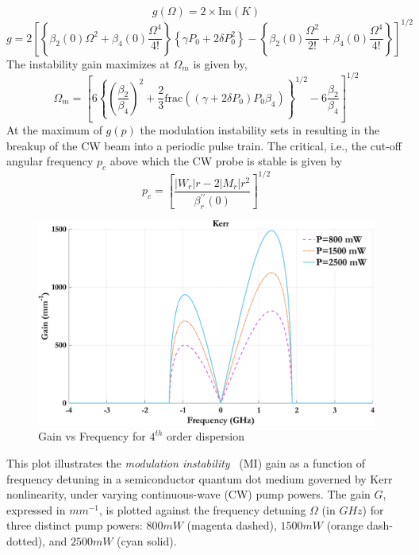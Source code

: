 \documentclass[12pt,a4paper]{article}
\begin{document}
\begin{equation}
g(\Omega) = 2 \times \text{Im}(K)
\end{equation}
\begin{equation}
g = 2 {\left[ \left\{ \beta_2(0) \Omega^2 + \beta_4(0) \frac{\Omega^4}{4!} \right\} \left\{ \gamma P_0 + 2 \delta P_0^2 \right\} - \left\{ \beta_2(0) \frac{\Omega^2}{2!} + \beta_4(0) \frac{\Omega^4}{4!} \right\} \right]}^{1/2}
\end{equation}
The instability gain maximizes at $\Omega_m$ is given by,
\begin{equation}
\Omega_m = {\left[ 6 {\left\{ {\left( \frac{\beta_2}{\beta_4} \right)}^2 + \frac{2}{3} \text{frac} \left( (\gamma + 2\delta P_0) P_0 \beta_4 \right) \right\}}^{1/2} - 6 \frac{\beta_2}{\beta_4} \right]}^{1/2}
\end{equation}
At the maximum of \(g(p)\) the modulation instability sets in resulting in the breakup of the CW beam into a periodic pulse train. The critical, i.e., the cut-off angular frequency \(p_c\) above which the CW probe is stable is given by
\begin{equation}
p_c = {\left[ \frac{|W_r|r - 2|M_r|r^2}{\beta^{\prime\prime}_r(0)} \right]}^{1/2}
\end{equation}
\vspace{0pt}

\begin{figure}[h]
    \centering
    \includegraphics[width=0.7\linewidth]{Plots/G_v_Power.jpeg}
    \caption{Gain vs Frequency for $4^{th}$ order dispersion}
    \label{fig:G_v_P}
\end{figure}
This plot illustrates the \textit{modulation instability}~\cite{lighthall} (MI) gain as a function of frequency detuning in a semiconductor quantum dot medium governed by Kerr nonlinearity, under varying continuous-wave (CW) pump powers. The gain \( G \), expressed in ${mm^{-1}}$, is plotted against the frequency detuning \( \Omega \) (in ${GHz}$) for three distinct pump powers: ${800}{mW}$ (magenta dashed), ${1500}{mW}$ (orange dash-dotted), and ${2500}{mW}$ (cyan solid).
\end{document}
